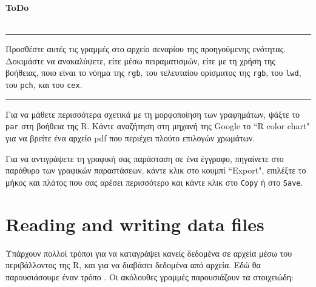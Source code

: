 \documentclass[a4paper,11pt,twocolumn,tablecaptionabove]{scrartcl}
\newenvironment{ToDo} {%
  \begin{flushright}
    \hfill
    \begin{minipage}{0.95\columnwidth}         %
    \textsf{\textbf{ToDo}} \\
      \vspace{-0.85cm}\\
      {\color{Gray}\rule[-0.1cm]{\columnwidth}{1.5pt}}} { %
      {\color{Gray} \rule[0.3cm]{\columnwidth}{1.5pt}}
    \end{minipage}
    \vspace{1em}
  \end{flushright}
  }
\begin{document}
\begin{ToDo}
  Προσθέστε αυτές τις γραμμές στο αρχείο σεναρίου της προηγούμενης ενότητας. Δοκιμάστε να ανακαλύψετε, είτε 
  μέσω πειραματισμών, είτε με τη χρήση της βοήθειας, ποιο είναι το νόημα της \texttt{rgb}, του τελευταίου
  ορίσματος της \texttt{rgb}, του \texttt{lwd}, του \texttt{pch}, και του \texttt{cex}.\\
\end{ToDo}

Για να μάθετε περισσότερα σχετικά με τη μορφοποίηση των γραφημάτων, ψάξτε το \texttt{par} στη βοήθεια της R.
Κάντε αναζήτηση στη μηχανή της Google το ``R color chart" για να βρείτε ένα αρχείο pdf που περιέχει πλούτο
επιλογών χρωμάτων.

Για να αντιγράψετε τη γραφική σας παράσταση σε ένα έγγραφο, πηγαίνετε στο παράθυρο των γραφικών παραστάσεων,
κάντε κλικ στο κουμπί ``Export", επιλέξτε το μήκος και πλάτος που σας αρέσει περισσότερο και κάντε κλικ στο
\texttt{Copy} ή στο \texttt{Save}. 


\section{Reading and writing data files}
\label{sec:reading-writing-data}

Υπάρχουν πολλοί τρόποι για να καταγράψει κανείς δεδομένα σε αρχεία μέσω του περιβάλλοντος της R, και για να 
διαβάσει δεδομένα από αρχεία. Εδώ θα παρουσιάσουμε έναν τρόπο . Οι ακόλουθες γραμμές παρουσιάζουν τα στοιχειώδη:
\end{document}
